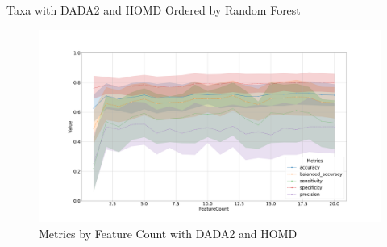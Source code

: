 \documentclass[a4paper]{article}
\begin{document}
{            \begin{table}[p]
                \centering
                \caption{Taxa with DADA2 and HOMD Ordered by Random Forest}
                \label{tb:RF-every-DADA2-homd}

            \end{table}

            \begin{figure}[p]
                \centering
                \includegraphics[width=0.7 \linewidth]{figures/RandomForest/ANCOM.DADA2.homd/metrics.png}
                \caption{Metrics by Feature Count with DADA2 and HOMD}
                \label{fig:RF-every-metrics-DADA2-homd}
            \end{figure}

}
\end{document}

